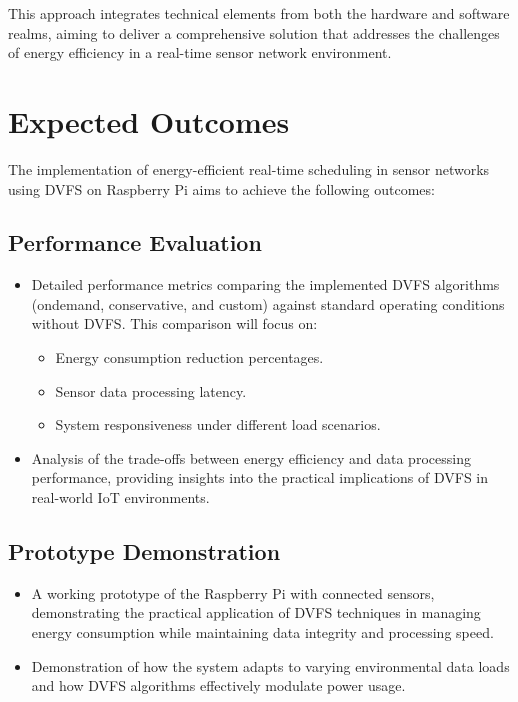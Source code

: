 \documentclass[twocolumn, 10pt]{article}
\begin{document}
This approach integrates technical elements from both the hardware and software realms, aiming to deliver a comprehensive solution that addresses the challenges of energy efficiency in a real-time sensor network environment.
\vspace{-2mm}
\section*{Expected Outcomes}
\vspace{-2mm}
The implementation of energy-efficient real-time scheduling in sensor networks using DVFS on Raspberry Pi aims to achieve the following outcomes:

\subsection*{Performance Evaluation}
\begin{itemize}
    \item Detailed performance metrics comparing the implemented DVFS algorithms (ondemand, conservative, and custom) against standard operating conditions without DVFS. This comparison will focus on:
    \begin{itemize}
        \item Energy consumption reduction percentages.
        \item Sensor data processing latency.
        \item System responsiveness under different load scenarios.
    \end{itemize}
    \item Analysis of the trade-offs between energy efficiency and data processing performance, providing insights into the practical implications of DVFS in real-world IoT environments.
\end{itemize}

\subsection*{Prototype Demonstration}
\begin{itemize}
    \item A working prototype of the Raspberry Pi with connected sensors, demonstrating the practical application of DVFS techniques in managing energy consumption while maintaining data integrity and processing speed.
    \item Demonstration of how the system adapts to varying environmental data loads and how DVFS algorithms effectively modulate power usage.  
\end{itemize}
\end{document}
